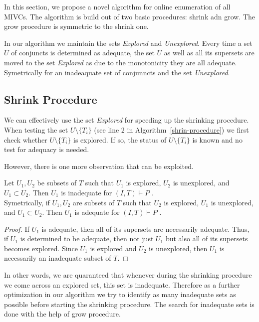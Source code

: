 In this section, we propose a novel algorithm for online enumeration of all MIVCs. The algorithm is build out of two basic procedures: shrink adn grow. The grow procedure is symmetric to the shrink one.
 
In our algorithm we maintain the sets \textit{Explored} and  \textit{Unexplored}. Every time a set $U$ of conjuncts is determined as adequate, the set $U$ as well as all its supersets are moved to the set  \textit{Explored} as due to the monotonicity they are all adequate. Symetrically for an inadeaquate set of conjunncts and the set \textit{Unexplored}. 

\subsection{Shrink Procedure}
We can effectively use the set  \textit{Explored} for speeding up the shrinking procedure. When testing the set $U \setminus \{T_i\}$ (see line 2 in Algorithm~\ref{shrin-procedure}) we first check whether  $U \setminus \{T_i\}$ is explored. If so, the status of  $U \setminus \{T_i\}$ is known and no test for adequacy is needed.

However, there is one more observation that can be exploited. 


\begin{observation}
\label{observation:explored-property}
Let $U_1, U_2$ be subsets of $T$ such that $U_1$ is explored, $U_2$ is unexplored, and $U_1 \subset U_2$. Then $U_1$ is inadequate  for $(I, T) \vdash P$ .\\
Symetrically, if $U_1, U_2$ are subsets of $T$ such that $U_2$ is explored, $U_1$ is unexplored, and $U_1 \subset U_2$. Then $U_1$ is adequate  for $(I, T) \vdash P$ .
\end{observation} 

\begin{proof}
If $U_1$ is adequate, then all of its supersets are necessarily adequate. Thus, if $U_1$ is determined to be adequate, then not just $U_1$ but also all of its supersets becomes explored. Since $U_1$ is explored and $U_2$ is unexplored, then $U_1$ is necessarily an inadequate subset of $T$.
\end{proof}

In other words, we are quaranteed that whenever during the shrinking procedure we come across an explored set, this set is inadequate. Therefore as a further optimization in our algorithm we try to identify as many inadequate sets as possible before starting the shrinking procedure. The search for inadequate sets is done with the help  of grow procedure. 


